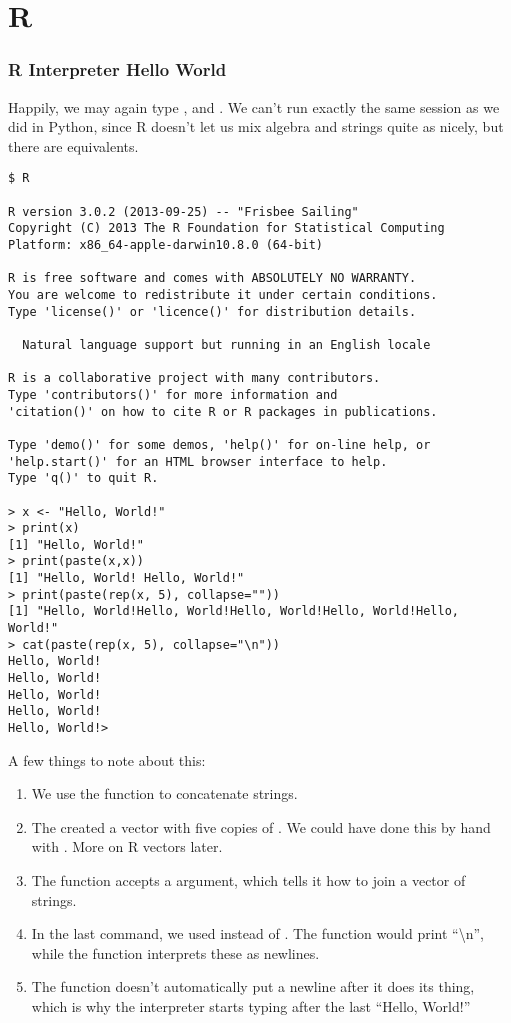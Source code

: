 \chapter{R}
\subsection{R Interpreter Hello World}
Happily, we may again type , and .
We can't run exactly the same session as we did in Python, since R doesn't let us
mix algebra and strings quite as nicely, but there are equivalents.

\begin{lstlisting}[style=bash]
$ R

R version 3.0.2 (2013-09-25) -- "Frisbee Sailing"
Copyright (C) 2013 The R Foundation for Statistical Computing
Platform: x86_64-apple-darwin10.8.0 (64-bit)

R is free software and comes with ABSOLUTELY NO WARRANTY.
You are welcome to redistribute it under certain conditions.
Type 'license()' or 'licence()' for distribution details.

  Natural language support but running in an English locale

R is a collaborative project with many contributors.
Type 'contributors()' for more information and
'citation()' on how to cite R or R packages in publications.

Type 'demo()' for some demos, 'help()' for on-line help, or
'help.start()' for an HTML browser interface to help.
Type 'q()' to quit R.

> x <- "Hello, World!"
> print(x)
[1] "Hello, World!"
> print(paste(x,x))
[1] "Hello, World! Hello, World!"
> print(paste(rep(x, 5), collapse=""))
[1] "Hello, World!Hello, World!Hello, World!Hello, World!Hello, World!"
> cat(paste(rep(x, 5), collapse="\n"))
Hello, World!
Hello, World!
Hello, World!
Hello, World!
Hello, World!> 
\end{lstlisting}
A few things to note about this:
\begin{enumerate}
\item We use the  function to concatenate strings.
\item The  created a vector with five copies of . We 
  could have done this by hand with .  More on R vectors
  later.
\item The  function accepts a  argument, which tells 
  it how to join a vector of strings.
\item In the last command, we used  instead of .  The
   function would print ``\textbackslash n'', while the  function
  interprets these as newlines.  
\item The  function doesn't automatically put a newline after it 
  does its thing, which is why the interpreter starts typing after the last
  ``Hello, World!''
\end{enumerate}


